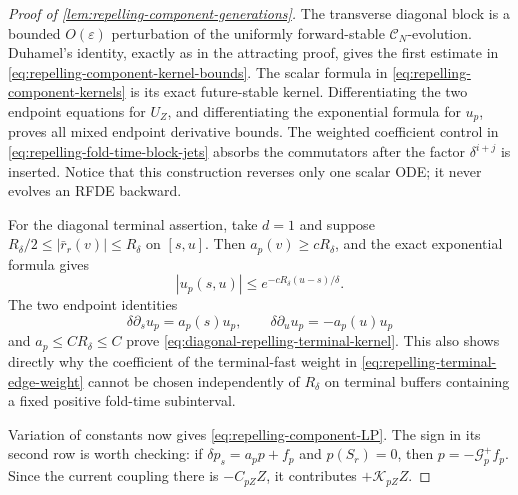 \begin{proof}[Proof of
\cref{lem:repelling-component-generations}]
The transverse diagonal block is a bounded \(O(\varepsilon)\) perturbation
of the uniformly forward-stable \(\mathcal C_N\)-evolution.  Duhamel's
identity, exactly as in the attracting proof, gives the first estimate in
\cref{eq:repelling-component-kernel-bounds}.  The scalar formula in
\cref{eq:repelling-component-kernels} is its exact future-stable kernel.
Differentiating the two endpoint equations for \(U_Z\), and differentiating
the exponential formula for \(u_p\), proves all mixed endpoint derivative
bounds.  The weighted coefficient control in
\cref{eq:repelling-fold-time-block-jets} absorbs the commutators after the
factor \(\delta^{i+j}\) is inserted.  Notice that this construction reverses
only one scalar ODE; it never evolves an RFDE backward.

For the diagonal terminal assertion, take \(d=1\) and suppose
\(R_\delta/2\le|\bar r_r(v)|\le R_\delta\) on \([s,u]\).
Then \(a_p(v)\ge cR_\delta\), and the exact exponential formula gives
\[
 |u_p(s,u)|\le e^{-cR_\delta(u-s)/\delta}.
\]
The two endpoint identities
\[
 \delta\partial_su_p=a_p(s)u_p,\qquad
 \delta\partial_uu_p=-a_p(u)u_p
\]
and \(a_p\le CR_\delta\le C\) prove
\cref{eq:diagonal-repelling-terminal-kernel}.  This also shows directly
why the coefficient of the terminal-fast weight in
\cref{eq:repelling-terminal-edge-weight} cannot be chosen independently
of \(R_\delta\) on terminal buffers containing a fixed positive
fold-time subinterval.

Variation of constants now gives
\cref{eq:repelling-component-LP}.  The sign in its second row is worth
checking: if \(\delta p_s=a_pp+f_p\) and \(p(S_r)=0\), then
\(p=-\mathcal G_p^+f_p\).  Since the current coupling there is
\(-C_{pZ}Z\), it contributes \(+\mathcal K_{pZ}Z\).


\end{proof}
